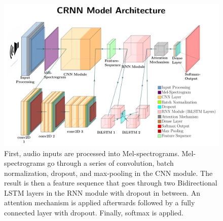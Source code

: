 \documentclass[../main.tex]{subfiles}
\begin{document}
\begin{figure}[h]
    \centering
    \includegraphics[width=\textwidth]{../figure/architecture_figure.pdf}
    \caption{First, audio inputs are processed into Mel-spectrograms. Mel-spectrograms 
    go through a series of convolution, batch normalization, dropout, and max-pooling 
    in the CNN module. The result is then a feature sequence that goes through 
    two Bidirectional LSTM layers in the RNN module with dropout in between.
    An attention mechanism is applied afterwards followed by a fully connected
    layer with dropout. Finally, softmax is applied.}
    \label{fig:architecture}
\end{figure}
\end{document}
